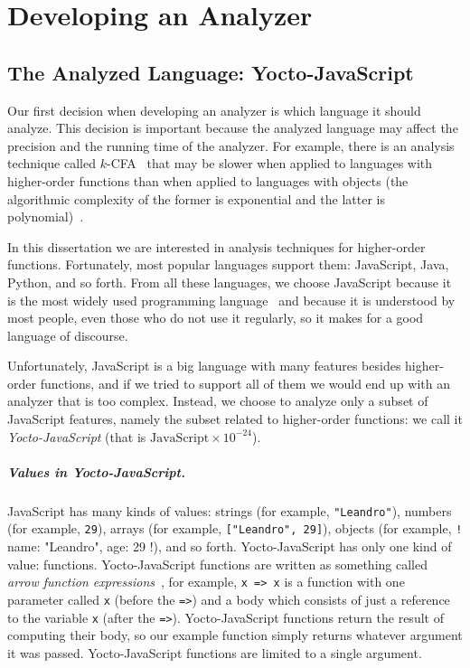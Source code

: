 \documentclass[12pt, oneside]{book}
\begin{document}
\chapter{Developing an Analyzer}


\section{The Analyzed Language: Yocto-JavaScript}

Our first decision when developing an analyzer is which language it should analyze. This decision is important because the analyzed language may affect the precision and the running time of the analyzer. For example, there is an analysis technique called \(k\)-CFA~\cite{k-cfa} that may be slower when applied to languages with higher-order functions than when applied to languages with objects (the algorithmic complexity of the former is exponential and the latter is polynomial)~\cite{m-cfa}.

In this dissertation we are interested in analysis techniques for higher-order functions. Fortunately, most popular languages support them: JavaScript, Java, Python, and so forth. From all these languages, we choose JavaScript because it is the most widely used programming language~\cite{stack-overflow-developer-survey, jet-brains-developer-survey} and because it is understood by most people, even those who do not use it regularly, so it makes for a good language of discourse.

Unfortunately, JavaScript is a big language with many features besides higher-order functions, and if we tried to support all of them we would end up with an analyzer that is too complex. Instead, we choose to analyze only a subset of JavaScript features, namely the subset related to higher-order functions: we call it \emph{Yocto-JavaScript} (that is \(\mathrm{JavaScript} \times 10^{-24}\)).

\paragraph{Values in Yocto-JavaScript.}

JavaScript has many kinds of values: strings (for example, \texttt{"Leandro"}), numbers (for example, \texttt{29}), arrays (for example, \texttt{["Leandro", 29]}), objects (for example, \texttt!{ name: "Leandro", age: 29 }!), and so forth. Yocto-JavaScript has only one kind of value: functions. Yocto-JavaScript functions are written as something called \emph{arrow function expressions}~\cite{arrow-function-expressions}, for example, \texttt{x => x} is a function with one parameter called \texttt{x} (before the \texttt{=>}) and a body which consists of just a reference to the variable \texttt{x} (after the \texttt{=>}). Yocto-JavaScript functions return the result of computing their body, so our example function simply returns whatever argument it was passed. Yocto-JavaScript functions are limited to a single argument.
\end{document}
